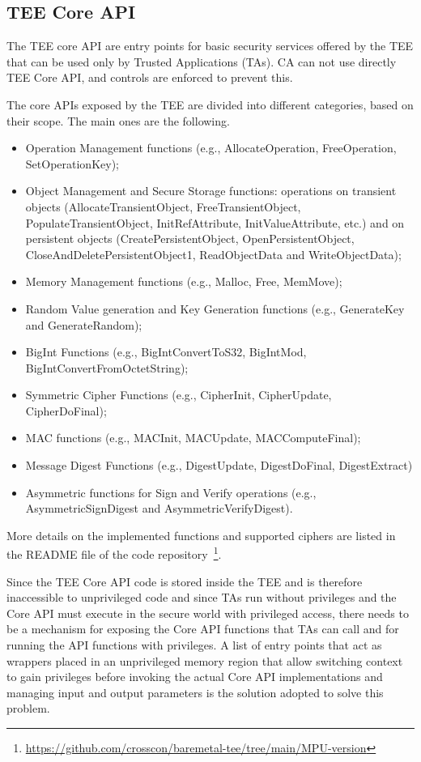 \documentclass{article}
\begin{document}
\subsection{TEE Core API}

The TEE core API are entry points for basic security services offered by the TEE that can be used only by Trusted Applications (TAs). CA can not use directly TEE Core API, and controls are enforced to prevent this. 

The core APIs exposed by the TEE are divided into different categories, based on their scope. The main ones are the following.

\begin{itemize}
    \item Operation Management functions (e.g., AllocateOperation, FreeOperation, SetOperationKey);
    \item Object Management and Secure Storage functions: operations on transient objects (AllocateTransientObject, FreeTransientObject, PopulateTransientObject, InitRefAttribute, InitValueAttribute, etc.) and on persistent objects (CreatePersistentObject, OpenPersistentObject, CloseAndDeletePersistentObject1, ReadObjectData and WriteObjectData);
    \item Memory Management functions (e.g., Malloc, Free, MemMove);
    \item Random Value generation and Key Generation functions (e.g., GenerateKey and GenerateRandom);
    \item BigInt Functions (e.g., BigIntConvertToS32, BigIntMod, BigIntConvertFromOctetString);
    \item Symmetric Cipher Functions (e.g., CipherInit, CipherUpdate, CipherDoFinal);
    \item MAC functions (e.g., MACInit, MACUpdate, MACComputeFinal);
    \item Message Digest Functions (e.g., DigestUpdate, DigestDoFinal, DigestExtract)
    \item Asymmetric functions for Sign and Verify operations (e.g., AsymmetricSignDigest and AsymmetricVerifyDigest).
\end{itemize}

More details on the implemented functions and supported ciphers are listed in the README file of the code repository~\footnote{\url{https://github.com/crosscon/baremetal-tee/tree/main/MPU-version}}. 

Since the TEE Core API code is stored inside the TEE and is therefore inaccessible to unprivileged code and since TAs run without privileges and the Core API must execute in the secure world with privileged access, there needs to be a mechanism for exposing the Core API functions that TAs can call and for running the API functions with privileges. A list of entry points that act as wrappers placed in an unprivileged memory region that allow switching context to gain privileges before invoking the actual Core API implementations and managing input and output parameters is the solution adopted to solve this problem.
\end{document}
